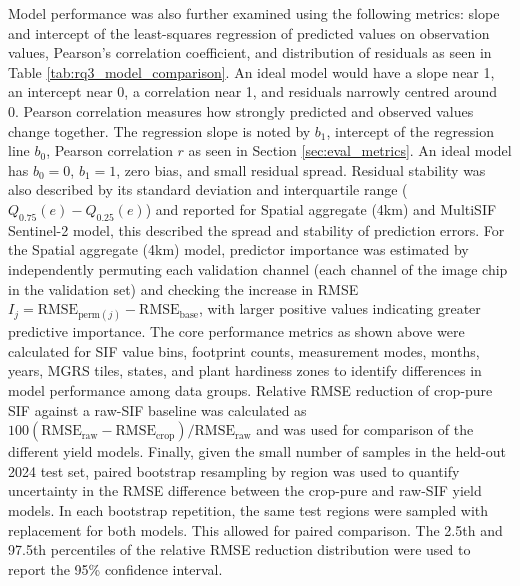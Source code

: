 Model performance was also further examined using the following metrics: slope and intercept of the least-squares regression of predicted values on observation values, Pearson's correlation coefficient, and distribution of residuals as seen in Table \ref{tab:rq3_model_comparison}. An ideal model would have a slope near 1, an intercept near 0, a correlation near 1, and residuals narrowly centred around 0. Pearson correlation measures how strongly predicted and observed values change together. The regression slope is noted by $b_1$, intercept of the regression line  $b_0$, Pearson correlation $r$ as seen in Section \ref{sec:eval_metrics}. An ideal model has $b_0=0$, $b_1=1$, zero bias, and small residual spread. Residual stability  was also described by its standard deviation and interquartile range ($Q_{0.75}(e)-Q_{0.25}(e)$) and reported for Spatial aggregate (4km) and MultiSIF Sentinel-2 model, this described the spread and stability of prediction errors. For the Spatial aggregate (4km) model, predictor importance was estimated by independently permuting each validation channel (each channel of the image chip in the validation set) and checking the increase in RMSE $I_j=\mathrm{RMSE}_{\mathrm{perm}(j)}-\mathrm{RMSE}_{\mathrm{base}}$, with larger positive values indicating greater predictive importance. The core performance metrics as shown above were calculated for SIF value bins, footprint counts, measurement modes, months, years, MGRS tiles, states, and plant hardiness zones to identify differences in model performance among data groups. Relative RMSE reduction of crop-pure SIF against a raw-SIF baseline was calculated as $100(\mathrm{RMSE}_{\mathrm{raw}}-\mathrm{RMSE}_{\mathrm{crop}})/\mathrm{RMSE}_{\mathrm{raw}}$ and was used for comparison of the different yield models. Finally, given the small number of samples in the held-out 2024 test set, paired bootstrap resampling by region was used to quantify uncertainty in the RMSE difference between the crop-pure and raw-SIF yield models. In each bootstrap repetition, the same test regions were sampled with replacement for both models. This allowed for paired comparison. The 2.5th and 97.5th percentiles of the relative RMSE reduction distribution were used to report the 95\% confidence interval.

